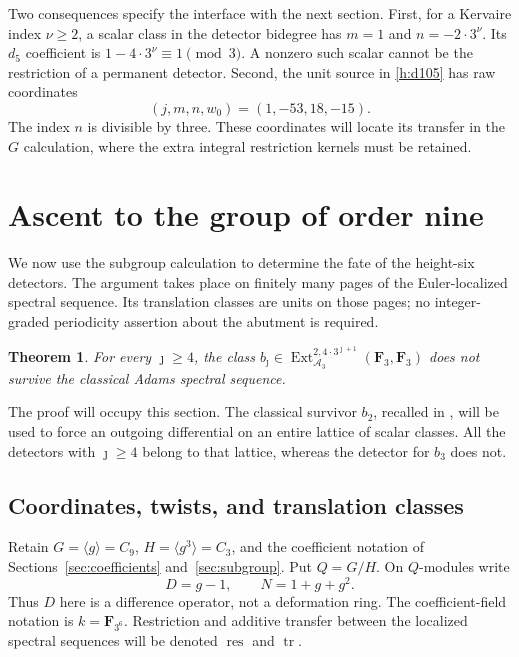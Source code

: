 \documentclass[11pt]{article}
\newtheorem{theorem}{Theorem}[section]
\theoremstyle{definition}
\theoremstyle{remark}
\numberwithin{equation}{section}
\begin{document}
Two consequences specify the interface with the next section.
First, for a Kervaire index $\nu\geq2$, a scalar class in the detector
bidegree has $m=1$ and $n=-2\cdot3^\nu$. Its $d_5$ coefficient is
$1-4\cdot3^\nu\equiv1\pmod3$. A nonzero such scalar cannot be the
restriction of a permanent detector. Second, the unit source in
\eqref{h:d105} has raw coordinates
\begin{equation}
 \label{h:unit-source-raw}
 (j,m,n,w_0)=(1,-53,18,-15).
\end{equation}
The index $n$ is divisible by three. These coordinates will locate
its transfer in the $G$ calculation, where the extra integral
restriction kernels must be retained.

\section{Ascent to the group of order nine}\label{sec:ascent}

We now use the subgroup calculation to determine the fate of the
height-six detectors.  The argument takes place on finitely many pages
of the Euler-localized spectral sequence.  Its translation classes are
units on those pages; no integer-graded periodicity assertion about the
abutment is required.

\begin{theorem}\label{g:tail-exclusion}
For every $\jmath\geq4$, the class
$b_{\jmath}\in\operatorname{Ext}_{\mathcal A_3}^{2,4\cdot3^{\jmath+1}}
(\mathbf F_3,\mathbf F_3)$ does not survive the classical Adams spectral sequence.
\end{theorem}

The proof will occupy this section.  The classical survivor $b_2$,
recalled in \cite[Corollary~1.2]{Amelotte}, will be
used to force an outgoing differential on an entire lattice of scalar
classes.  All the detectors with $\jmath\geq4$ belong to that lattice,
whereas the detector for $b_3$ does not.

\subsection{Coordinates, twists, and translation classes}

Retain $G=\langle g\rangle=C_9$, $H=\langle g^3\rangle=C_3$,
and the coefficient notation of Sections~\ref{sec:coefficients}
and~\ref{sec:subgroup}.  Put $Q=G/H$.  On $Q$-modules write
\[
 D=g-1,\qquad N=1+g+g^2.
\]
Thus $D$ here is a difference operator, not a deformation ring.  The
coefficient-field notation is $k=\mathbf F_{3^6}$.  Restriction and additive
transfer between the localized spectral sequences will be denoted
$\operatorname{res}$ and $\operatorname{tr}$.
\end{document}
